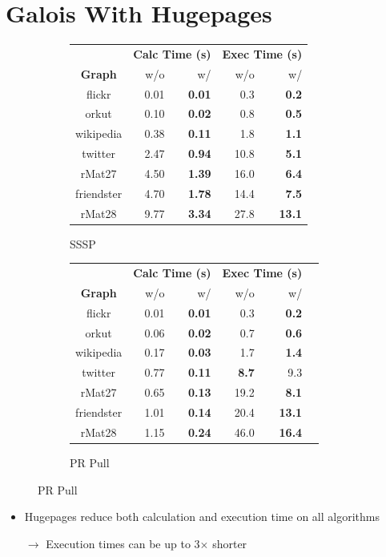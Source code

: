 \documentclass{meetings}
\begin{document}
\section{Galois With Hugepages}
\begin{figure}[h!]
\begin{subfigure}{0.4\textwidth}
	\sffamily
	\small
	\centering
	\begin{tabular}{cr@{\tabskip 2 \tabcolsep}rr@{\tabskip 2 \tabcolsep}r}
		&\multicolumn{2}{c}{\bf Calc Time (s)}&\multicolumn{2}{c}{\bf Exec Time (s)}\\
		\cmidrule{2-3}\cmidrule{4-5}
		\bf Graph&w/o&w/&w/o&w/\\
		\midrule
		flickr & 0.01 & \bf 0.01 & 0.3 & \bf 0.2\\
		orkut & 0.10 & \bf 0.02 & 0.8 & \bf 0.5\\
		wikipedia & 0.38 & \bf 0.11 & 1.8 & \bf 1.1\\
		twitter & 2.47 & \bf 0.94 & 10.8 & \bf 5.1\\
		rMat27 & 4.50 & \bf 1.39 & 16.0 & \bf 6.4\\
		friendster & 4.70 & \bf 1.78 & 14.4 & \bf 7.5\\
		rMat28 & 9.77 & \bf 3.34 & 27.8 & \bf 13.1\\
\end{tabular}
\caption{SSSP}
\end{subfigure}
\hfil
\begin{subfigure}{0.4\textwidth}
\sffamily
\small
\centering
\begin{tabular}{cr@{\tabskip 2 \tabcolsep}rr@{\tabskip 2 \tabcolsep}rc}
		&\multicolumn{2}{c}{\bf Calc Time (s)}&\multicolumn{2}{c}{\bf Exec Time (s)}\\
		\cmidrule{2-3}\cmidrule{4-5}
		\bf Graph&w/o&w/&w/o&w/\\
		\midrule
		flickr & 0.01 & \bf 0.01 & 0.3 & \bf 0.2\\
		orkut & 0.06 & \bf 0.02 & 0.7 & \bf 0.6\\
		wikipedia & 0.17 & \bf 0.03 & 1.7 & \bf 1.4\\
		twitter & 0.77 & \bf 0.11 & \bf 8.7 & 9.3\\
		rMat27 & 0.65 & \bf 0.13 & 19.2 & \bf 8.1\\
		friendster & 1.01 & \bf 0.14 & 20.4 & \bf 13.1\\
		rMat28 & 1.15 & \bf 0.24 & 46.0 & \bf 16.4\\
\end{tabular}
\caption{PR Pull}
\end{subfigure}
\end{figure}
\vfill
\begin{itemize}
	\item Hugepages reduce both calculation and execution time on all algorithms
	\item[$\rightarrow$] Execution times can be up to 3$\times$ shorter
\end{itemize}
\vfill
\end{document}
